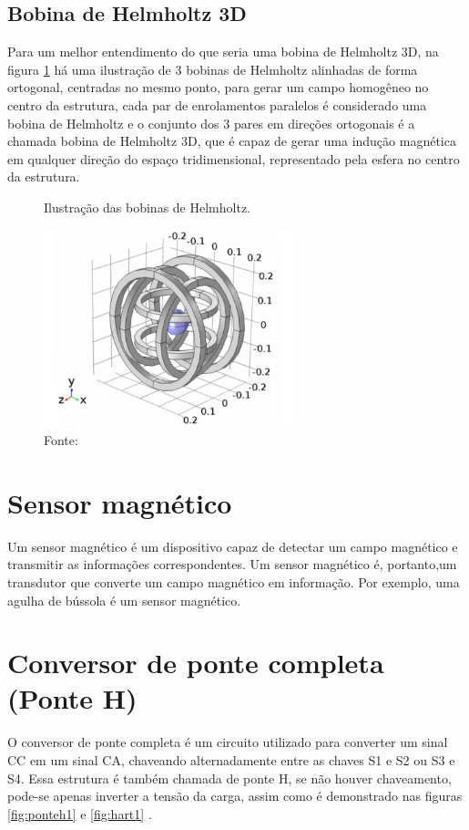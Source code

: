 \subsection{Bobina de Helmholtz 3D}

Para um melhor entendimento do que seria uma bobina de Helmholtz 3D, na figura \ref{fig:bob3d} há uma ilustração de 3 bobinas de Helmholtz alinhadas de forma ortogonal, centradas no mesmo ponto, para gerar um campo homogêneo no centro da estrutura, cada par de enrolamentos paralelos é considerado uma bobina de Helmholtz e o conjunto dos 3 pares em direções ortogonais é a chamada bobina de Helmholtz 3D, que é capaz de gerar uma indução magnética em qualquer direção do espaço tridimensional, representado pela esfera no centro da estrutura.

\begin{figure}[H]
    \centering
     \caption{Ilustração das bobinas de Helmholtz.}
     \includegraphics[width=0.65\textwidth]{./img/3dHMC.png}
     \caption*{Fonte: \cite{3dHelm}}
     \label{fig:bob3d}
\end{figure}

\section{Sensor magnético}

Um sensor magnético é um dispositivo capaz de detectar um campo magnético e transmitir as informações correspondentes. Um sensor magnético é, portanto,um transdutor que converte um campo magnético em informação. Por exemplo, uma agulha de bússola é um sensor magnético.\cite{popovic2003hall}

\section{Conversor de ponte completa (Ponte H)}
O conversor de ponte completa é um circuito utilizado para converter um sinal CC em um sinal CA, chaveando alternadamente entre as chaves S1 e S2 ou S3 e S4. Essa estrutura é também chamada de ponte H, se não houver chaveamento, pode-se apenas inverter a tensão da carga, assim como é demonstrado nas figuras \ref{fig:ponteh1} e \ref{fig:hart1} . \cite{hart2011power}


